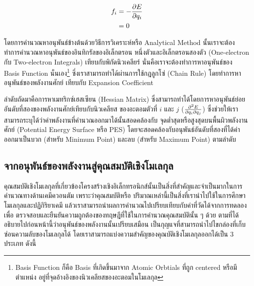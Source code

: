 \begin{align}
    f_{i} &= - \pdv{E}{q_{i}} \\
    &= 0
\end{align}

โดยการคำนวณหาอนุพันธ์ข้างต้นด้วยวิธีการวิเคราะห์หรือ Analytical Method นั้นเราจะต้องทำการคำนวณหาอนุพันธ์ของอินทิกรัลของอิเล็กตรอน%
หนึ่งตัวและอิเล็กตรอนสองตัว (One-electron กับ Two-electron Integrals) เทียบกับพิกัดนิวเคลียร์ นั่นคือเราจะต้องทำการหาอนุพันธ์ของ 
Basis Function นั่นเอง\footnote{Basis Function ก็คือ Basis ที่เกิดขึ้นมาจาก Atomic Orbtials ที่ถูก centered หรือมีตำแหน่ง%
อยู่ที่จุดอ้างอิงของนิวเคลียสของอะตอมในโมเลกุล} ซึ่งเราสามารถทำได้ผ่านการใช้กฎลูกโซ่ (Chain Rule) โดยทำการหาอนุพันธ์ของพลังงานศักย์%
เทียบกับ Expansion Coefficient

ลำดับถัดมาคือการหาเมทริกซ์เฮสเซียน (Hessian Matrix) ซึ่งสามารถทำได้โดยการหาอนุพันธ์ย่อยอันดับที่สองของพลังงานศักย์เทียบกับนิวเคลียส%
ของอะตอมตัวที่ $i$ และ $j$ ($\pdv{E}{q_{i}}{q_{j}}$) ซึ่งช่วยให้เราสามารถระบุได้ว่าค่าพลังงานที่คำนวณออกมาได้นั้นสอดคล้องกับ%
จุดต่ำสุดหรือสูงสุดบนพื้นผิวพลังงานศักย์ (Potential Energy Surface หรือ PES) โดยจะสอดคล้องกับอนุพันธ์อันดับที่สองที่ได้ค่าออกมาเป็นบวก 
(สำหรับ Minimum Point) และลบ (สำหรับ Maximum Point) ตามลำดับ

\subsection{จากอนุพันธ์ของพลังงานสู่คุณสมบัติเชิงโมเลกุล}
\label{ssec:ener_der_mol_prop}

คุณสมบัติเชิงโมเลกุลที่เกี่ยวข้องโครงสร้างเชิงอิเล็กทรอนิกส์นั้นเป็นสิ่งที่สำคัญและจำเป็นมากในการคำนวณทางด้านเคมีควอนตัม เพราะว่าคุณสมบัติหรือ%
ปริมาณเหล่านี้เป็นสิ่งที่เรานำไปใช้ในการศึกษาโมเลกุลและปฏิกิริยาเคมี แล้วเราสามารถนำผลการคำนวณไปเปรียบเทียบกับค่าที่วัดได้จากการทดลองเพื่อ%
ตรวจสอบและยืนยันความถูกต้องของทฤษฎีที่ใช้ในการคำนวณคุณสมบัตินั้น ๆ ด้วย ตามที่ได้อธิบายไปก่อนหน้านี้ว่าอนุพันธ์ของพลังงานนั้นเปรียบเสมือน%
เป็นกุญแจที่สามารถนำไปไขกล่องที่เก็บซ่อนความลับของโมเลกุลได้ โดยเราสามารถแบ่งความสำคัญของคุณบัติเชิงโมเลกุลออกได้เป็น 3 ประเภท ดังนี้

